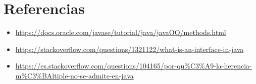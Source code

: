 \documentclass{article}
\begin{document}

\section{Referencias}
\begin{itemize}			
    \item \url{https://docs.oracle.com/javase/tutorial/java/javaOO/methods.html}
    \item \url{https://stackoverflow.com/questions/1321122/what-is-an-interface-in-java}
    \item \url{https://es.stackoverflow.com/questions/104165/por-qu%C3%A9-la-herencia-m%C3%BAltiple-no-se-admite-en-java}
\end{itemize}	
	
%
%
%
\end{document}
